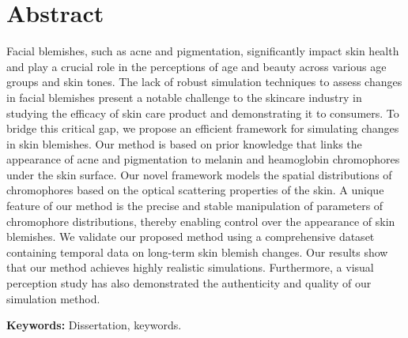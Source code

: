 \newpage

\chapter*{\centering Abstract}

\begin{spacing}{1.5}
\setlength{\parskip}{0.3in}


Facial blemishes, such as acne and pigmentation, significantly impact skin health and play a crucial role in the perceptions of age and beauty across various age groups and skin tones. The lack of robust simulation techniques to assess changes in facial blemishes present a notable challenge to the skincare industry in studying the efficacy of skin care product and demonstrating it to consumers. To bridge this critical gap, we propose an efficient framework for simulating changes in skin blemishes. Our method is based on prior knowledge that links the appearance of acne and pigmentation to melanin and heamoglobin chromophores under the skin surface. Our novel framework models the spatial distributions of chromophores based on the optical scattering properties of the skin. A unique feature of our method is the precise and stable manipulation of parameters of chromophore distributions, thereby enabling control over the appearance of skin blemishes. We validate our proposed method using a comprehensive dataset containing temporal data on long-term skin blemish changes. Our results show that our method achieves highly realistic simulations. Furthermore, a visual perception study has also demonstrated the authenticity and quality of our simulation method.

\par
\textbf{Keywords:} Dissertation, keywords.
\end{spacing}
\newpage
